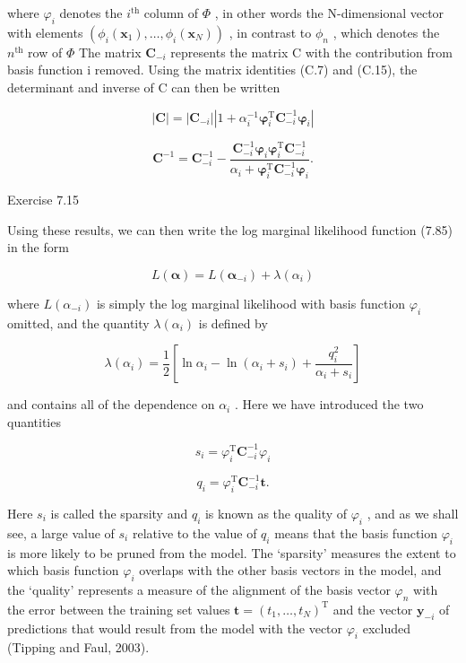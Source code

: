 \documentclass[
  10
]{article}
\begin{document}
where \(\varphi _ { i }\) denotes the \(i ^ { \mathrm { t h } }\) column
of \(\Phi\) , in other words the N-dimensional vector with elements
\(( \phi _ { i } ( \mathbf { x } _ { 1 } ) , \ldots , \phi _ { i } ( \mathbf { x } _ { N } ) )\)
, in contrast to \(\phi _ { n }\) , which denotes the
\(n ^ { \mathrm { t h } }\) row of \(\Phi\) The matrix
\(\mathbf { C } _ { - i }\) represents the matrix C with the
contribution from basis function i removed. Using the matrix identities
(C.7) and (C.15), the determinant and inverse of C can then be written

\[
{| \mathbf {C} |} = {| \mathbf {C} _ {- i} | | 1 + \alpha_ {i} ^ {- 1} \boldsymbol {\varphi} _ {i} ^ {\mathrm{T}} \mathbf {C} _ {- i} ^ {- 1} \boldsymbol {\varphi} _ {i} |}\tag{7.94}
\]

\[
\mathbf {C} ^ {- 1} = \mathbf {C} _ {- i} ^ {- 1} - \frac {\mathbf {C} _ {- i} ^ {- 1} \boldsymbol {\varphi} _ {i} \boldsymbol {\varphi} _ {i} ^ {\mathrm{T}} \mathbf {C} _ {- i} ^ {- 1}}{\alpha_ {i} + \boldsymbol {\varphi} _ {i} ^ {\mathrm{T}} \mathbf {C} _ {- i} ^ {- 1} \boldsymbol {\varphi} _ {i}}.\tag{7.95}
\]

Exercise 7.15

Using these results, we can then write the log marginal likelihood
function (7.85) in the form

\[
L (\boldsymbol {\alpha}) = L \left(\boldsymbol {\alpha} _ {- i}\right) + \lambda \left(\alpha_ {i}\right)\tag{7.96}
\]

where \(L (  { \alpha } _ { - i } )\) is simply the log marginal
likelihood with basis function \(\varphi _ { i }\) omitted, and the
quantity \(\lambda ( \alpha _ { i } )\) is defined by

\[
\lambda (\alpha_ {i}) = \frac {1}{2} \left[ \ln \alpha_ {i} - \ln (\alpha_ {i} + s _ {i}) + \frac {q _ {i} ^ {2}}{\alpha_ {i} + s _ {i}} \right]\tag{7.97}
\]

and contains all of the dependence on \(\alpha _ { i }\) . Here we have
introduced the two quantities

\[
{s _ {i}} = {\varphi_ {i} ^ {\mathrm{T}} \mathbf {C} _ {- i} ^ {- 1} \varphi_ {i}}\tag{7.98}
\]

\[
{q _ {i}} = {\varphi_ {i} ^ {\mathrm{T}} \mathbf {C} _ {- i} ^ {- 1} \mathbf {t}.}\tag{7.99}
\]

Here \(s _ { i }\) is called the sparsity and \(q _ { i }\) is known as
the quality of \(\varphi _ { i }\) , and as we shall see, a large value
of \(s _ { i }\) relative to the value of \(q _ { i }\) means that the
basis function \(\varphi _ { i }\) is more likely to be pruned from the
model. The `sparsity' measures the extent to which basis function
\(\varphi _ { i }\) overlaps with the other basis vectors in the model,
and the `quality' represents a measure of the alignment of the basis
vector \(\varphi _ { n }\) with the error between the training set
values
\(\mathbf { t } = ( t _ { 1 } , \ldots , t _ { N } ) ^ { \mathrm { T } }\)
and the vector \({ \pmb y } _ { - i }\) of predictions that would result
from the model with the vector \(\varphi _ { i }\) excluded (Tipping and
Faul, 2003).
\end{document}
